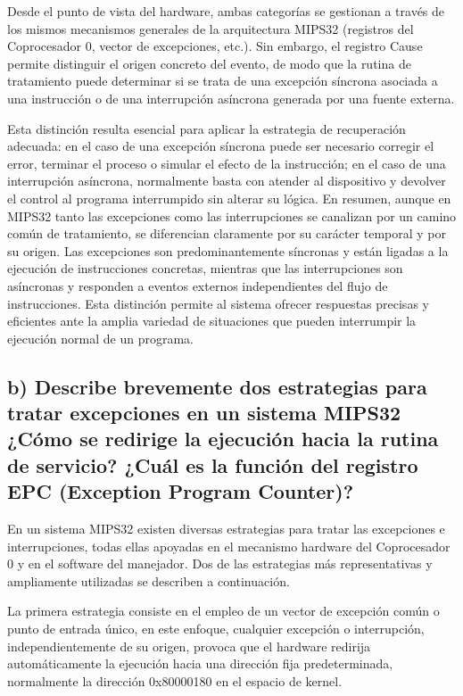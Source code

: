 \documentclass[12pt, letterpaper]{article}
\begin{document}
Desde el punto de vista del hardware, ambas categorías se gestionan a través de los mismos mecanismos generales de la arquitectura MIPS32 (registros del Coprocesador 0, vector de excepciones, etc.). Sin embargo, el registro Cause permite distinguir el origen concreto del evento, de modo que la rutina de tratamiento puede determinar si se trata de una excepción síncrona asociada a una instrucción o de una interrupción asíncrona generada por una fuente externa.

Esta distinción resulta esencial para aplicar la estrategia de recuperación adecuada: en el caso de una excepción síncrona puede ser necesario corregir el error, terminar el proceso o simular el efecto de la instrucción; en el caso de una interrupción asíncrona, normalmente basta con atender al dispositivo y devolver el control al programa interrumpido sin alterar su lógica.
En resumen, aunque en MIPS32 tanto las excepciones como las interrupciones se canalizan por un camino común de tratamiento, se diferencian claramente por su carácter temporal y por su origen. Las excepciones son predominantemente síncronas y están ligadas a la ejecución de instrucciones concretas, mientras que las interrupciones son asíncronas y responden a eventos externos independientes del flujo de instrucciones. Esta distinción permite al sistema ofrecer respuestas precisas y eficientes ante la amplia variedad de situaciones que pueden interrumpir la ejecución normal de un programa.

\subsection*{b) Describe brevemente dos estrategias para tratar excepciones en un sistema MIPS32 ¿Cómo se redirige la ejecución hacia la rutina de servicio? ¿Cuál es la función del registro EPC (Exception Program Counter)?}

En un sistema MIPS32 existen diversas estrategias para tratar las excepciones e interrupciones, todas ellas apoyadas en el mecanismo hardware del Coprocesador 0 y en el software del manejador. Dos de las estrategias más representativas y ampliamente utilizadas se describen a continuación.

La primera estrategia consiste en el empleo de un vector de excepción común o punto de entrada único, en este enfoque, cualquier excepción o interrupción, independientemente de su origen, provoca que el hardware redirija automáticamente la ejecución hacia una dirección fija predeterminada, normalmente la dirección 0x80000180 en el espacio de kernel.
\end{document}
